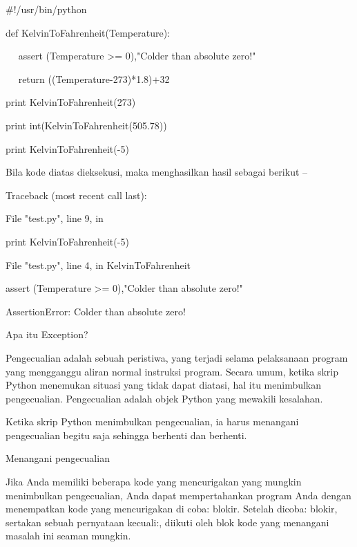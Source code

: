 \documentclass[a4paper,12pt]{report}
\begin{document}
\noindent 
 $  \#  $!/usr/bin/python \par
\noindent 
def KelvinToFahrenheit(Temperature): \par
\noindent 
~~ assert (Temperature >= 0),"Colder than absolute zero!" \par
\noindent 
~~ return ((Temperature-273)*1.8)+32 \par
\noindent 
print KelvinToFahrenheit(273) \par
\noindent 
print int(KelvinToFahrenheit(505.78)) \par
\noindent 
print KelvinToFahrenheit(-5) \par
\vspace{14pt}
\noindent 
Bila kode diatas dieksekusi, maka menghasilkan hasil sebagai berikut – \par
{} \par
{} \par
\noindent 
Traceback (most recent call last): \par
\noindent 
File "test.py", line 9, in  \par
\noindent 
print KelvinToFahrenheit(-5) \par
\noindent 
File "test.py", line 4, in KelvinToFahrenheit \par
\noindent 
assert (Temperature >= 0),"Colder than absolute zero!" \par
\noindent 
AssertionError: Colder than absolute zero! \par
\vspace{12pt}
\vspace{12pt}
\noindent 
Apa itu Exception? \par
\vspace{12pt}
\noindent 
Pengecualian adalah sebuah peristiwa, yang terjadi selama pelaksanaan program yang mengganggu aliran normal instruksi program. Secara umum, ketika skrip Python menemukan situasi yang tidak dapat diatasi, hal itu menimbulkan pengecualian. Pengecualian adalah objek Python yang mewakili kesalahan. \par
\vspace{12pt}
\noindent 
Ketika skrip Python menimbulkan pengecualian, ia harus menangani pengecualian begitu saja sehingga berhenti dan berhenti. \par
\noindent 
Menangani pengecualian \par
\vspace{12pt}
\noindent 
Jika Anda memiliki beberapa kode yang mencurigakan yang mungkin menimbulkan pengecualian, Anda dapat mempertahankan program Anda dengan menempatkan kode yang mencurigakan di coba: blokir. Setelah dicoba: blokir, sertakan sebuah pernyataan kecuali:, diikuti oleh blok kode yang menangani masalah ini seaman mungkin. \par
\end{document}
